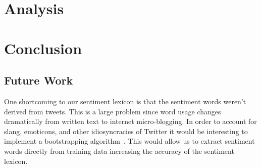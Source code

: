 \documentclass[11pt]{article}
\begin{document}
\section{Analysis}

\section{Conclusion}
\subsection{Future Work}
One shortcoming to our sentiment lexicon is that the sentiment words weren't derived from tweets. This is a large problem since word usage changes dramatically from written text to internet micro-blogging. In order to account for slang, emoticons, and other idiosyncracies of Twitter it would be interesting to implement a bootstrapping algorithm~\cite{Riloffbootstrapping}. This would allow us to extract sentiment words directly from training data increasing the accuracy of the sentiment lexicon.



\end{document}
